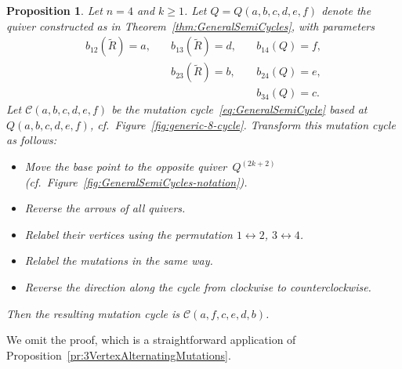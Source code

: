 \documentclass[11pt, letterpaper]{amsart}
\newtheorem{proposition}[theorem]{Proposition}
\theoremstyle{definition}
\numberwithin{equation}{section}
\begin{document}
\begin{proposition}
\label{pr:double-cycle}
Let $n=4$ and $k\ge1$. 
Let $Q=Q(a,b,c,d,e,f)$ denote the quiver constructed as in Theorem~\ref{thm:GeneralSemiCycles}, 
with parameters
\begin{equation*}
\begin{array}{lll}
b_{12}(\tilde R)\!=\!a, \quad & b_{13}(\tilde R)\!=\!d,   \quad & b_{14}(Q)\!=\!f, \\[2pt]
& b_{23}(\tilde R)\!=\!b, \quad & b_{24}(Q)\!=\!e, \\[2pt]
& & b_{34}(Q)\!=\!c. 
\end{array}
\end{equation*}
Let $\mathcal{C}(a,b,c,d,e,f)$ be the mutation cycle~\eqref{eq:GeneralSemiCycle} based at $Q(a,b,c,d,e,f)$, cf.\ Figure~\ref{fig:generic-8-cycle}. 
%
Transform this mutation cycle as follows: 
\begin{itemize}[leftmargin=.2in]
\item[-]
Move the base point to the opposite quiver~$Q^{(2k+2)}$ (cf.\ Figure~\ref{fig:GeneralSemiCycles-notation}).
\item[-]
Reverse the arrows of all quivers.
\item[-]
Relabel their vertices using the permutation $1\leftrightarrow2$, $3\leftrightarrow4$.
\item[-]
Relabel the mutations in the same way.
\item[-]
Reverse the direction along the cycle from clockwise to counterclockwise.
\end{itemize}
Then the resulting mutation cycle is $\mathcal{C}(a,f,c,e,d,b)$. %
\end{proposition}

We omit the proof, which is a straightforward application of Proposition~\ref{pr:3VertexAlternatingMutations}. 
\end{document}
